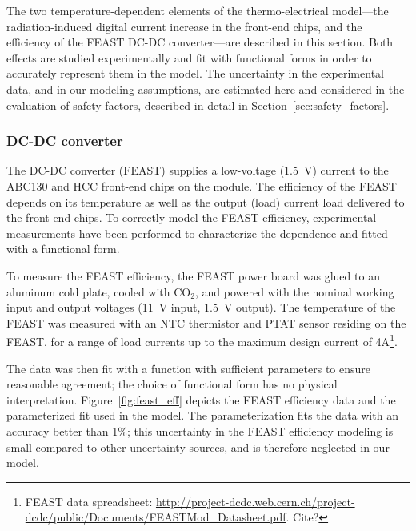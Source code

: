 
The two temperature-dependent elements of the thermo-electrical model---the
radiation-induced digital current increase in the front-end chips, and the
efficiency of the FEAST DC-DC converter---are described in this section.
Both effects are studied experimentally and fit with functional forms
in order to accurately represent them in the model.
The uncertainty in the experimental data, and in our modeling assumptions,
are estimated here and considered in the evaluation of safety factors,
described in detail in Section~\ref{sec:safety_factors}.

\subsubsection{DC-DC converter}

The DC-DC converter (FEAST) supplies a low-voltage (1.5~V) current to the ABC130 and HCC front-end
chips on the module.
The efficiency of the FEAST depends on its temperature as well as the output (load) current
load delivered to the front-end chips. To correctly model the FEAST efficiency, experimental
measurements have been performed to characterize the dependence and fitted with a functional form.

To measure the FEAST efficiency, the FEAST power board was glued to an aluminum cold plate, cooled
with CO$_2$, and powered with the nominal working input and output voltages (11~V input, 1.5~V output).
The temperature of the FEAST was measured with an NTC thermistor and PTAT sensor residing on the FEAST,
for a range of load currents up to the maximum design current of 4A\footnote
{
FEAST data spreadsheet: \url{http://project-dcdc.web.cern.ch/project-dcdc/public/Documents/FEASTMod_Datasheet.pdf}.
Cite?
}.

The data was then fit with a function with sufficient parameters to ensure reasonable agreement; the
choice of functional form has no physical interpretation. Figure~\ref{fig:feast_eff} depicts the
FEAST efficiency data and the parameterized fit used in the model. The parameterization fits the data
with an accuracy better than 1\%; this uncertainty in the FEAST efficiency modeling is small
compared to other uncertainty sources, and is therefore neglected in our model.

